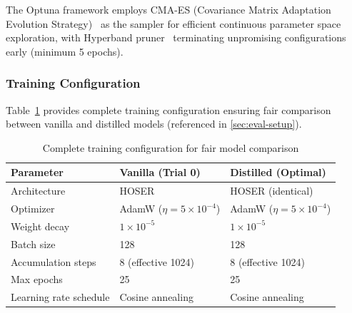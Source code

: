 The Optuna framework employs CMA-ES (Covariance Matrix Adaptation Evolution Strategy)~\cite{hansenCMAEvolutionStrategy2023} as the sampler for efficient continuous parameter space exploration, with Hyperband pruner~\cite{liHyperbandNovelBanditBased2018} terminating unpromising configurations early (minimum 5 epochs).

\subsubsection{Training Configuration}
\label{app:training-config}

Table~\ref{tab:training-config-appendix} provides complete training configuration ensuring fair comparison between vanilla and distilled models (referenced in \autoref{sec:eval-setup}).

\begin{table}[H]
    \centering
    \caption{Complete training configuration for fair model comparison}
    \label{tab:training-config-appendix}
    \begin{tabular}{lll}
        \toprule
        \textbf{Parameter}              & \textbf{Vanilla (Trial 0)}                                      & \textbf{Distilled (Optimal)}      \\
        \midrule
        Architecture                    & HOSER                                                           & HOSER (identical)                 \\
        Optimizer                       & AdamW ($\eta = 5 \times 10^{-4}$)                               & AdamW ($\eta = 5 \times 10^{-4}$) \\
        Weight decay                    & $1 \times 10^{-5}$                                              & $1 \times 10^{-5}$                \\
        Batch size                      & 128                                                             & 128                               \\
        Accumulation steps              & 8 (effective 1024)                                              & 8 (effective 1024)                \\
        Max epochs                      & 25                                                              & 25                                \\
        Learning rate schedule          & Cosine annealing                                                & Cosine annealing                  \\

\end{tabular}
\end{table}
